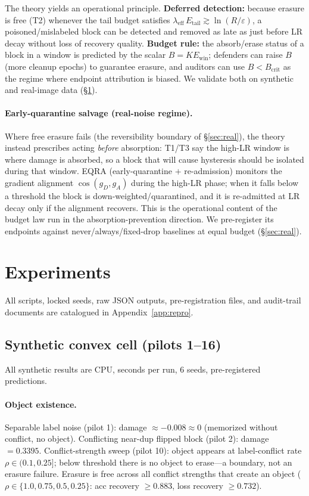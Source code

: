 \documentclass{article}
\newcommand{\Ewin}{E_{\mathrm{win}}}
\newcommand{\B}{B}            %
\newcommand{\lam}{\lambda}
\newcommand{\lameff}{\lam_{\mathrm{eff}}}
\begin{document}
The theory yields an operational principle. \textbf{Deferred detection:} because erasure is
free (T2) whenever the tail budget satisfies $\lameff\,E_{\mathrm{tail}}\gtrsim\ln(R/\varepsilon)$,
a poisoned/mislabeled block can be detected and removed as late as just before LR decay without
loss of recovery quality. \textbf{Budget rule:} the absorb/erase status of a block in a window is
predicted by the scalar $\B=K\Ewin$; defenders can raise $\B$ (more cleanup epochs) to guarantee
erasure, and auditors can use $\B<\B_{\mathrm{crit}}$ as the regime where endpoint attribution is
biased. We validate both on synthetic and real-image data (\S\ref{sec:exp}).

\paragraph{Early-quarantine salvage (real-noise regime).} Where free erasure fails (the
reversibility boundary of \S\ref{sec:real}), the theory instead prescribes acting \emph{before}
absorption: T1/T3 say the high-LR window is where damage is absorbed, so a block that will cause
hysteresis should be isolated during that window. EQRA (early-quarantine $+$ re-admission)
monitors the gradient alignment $\cos(g_D,g_A)$ during the high-LR phase; when it falls below a
threshold the block is down-weighted/quarantined, and it is re-admitted at LR decay only if the
alignment recovers. This is the operational content of the budget law run in the
absorption-prevention direction. We pre-register its endpoints against never/always/fixed-drop
baselines at equal budget (\S\ref{sec:real}).

\section{Experiments}
\label{sec:exp}
All scripts, locked seeds, raw JSON outputs, pre-registration files, and audit-trail documents
are catalogued in Appendix~\ref{app:repro}.

\subsection{Synthetic convex cell (pilots 1--16)}
All synthetic results are CPU, seconds per run, 6 seeds, pre-registered predictions.

\paragraph{Object existence.} Separable label noise (pilot 1): damage $\approx-0.008\approx0$
(memorized without conflict, no object). Conflicting near-dup flipped block (pilot 2): damage
$=0.3395$. Conflict-strength sweep (pilot 10): object appears at label-conflict rate
$\rho\in(0.1,0.25]$; below threshold there is no object to erase---a boundary, not an erasure
failure. Erasure is free across all conflict strengths that create an object
($\rho\in\{1.0,0.75,0.5,0.25\}$: acc recovery $\ge0.883$, loss recovery $\ge0.732$).
\end{document}
